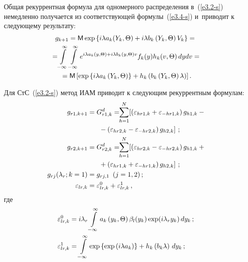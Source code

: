 \begin{multicols}{2}
Общая рекуррентная формула для одномерного распределения в~(\ref{e3.2-s}) 
немедленно получается из соответствующей формулы~(\ref{e3.4-s})
и~приводит к следующему результату:
 \begin{multline}
 g_{k+1} ={\sf M} \exp \left\{ i\lambda a_k (Y_k, \Theta) + i\lambda b_k 
    \left(Y_k,\Theta\right) V_k \right\}={}\\
{}=\! \int\limits_{-\infty}^\infty\int\limits_{-\infty}^\infty e^{i\lambda a_k(y,\Theta) + i\lambda b_k(y,\Theta) v} 
    f_k (y) h_k (v,\Theta)\, dydv={}\\
{}= {\sf M}\left[ \exp \left\{ i \lambda a_k \left(Y_k,\Theta\right) \right\} + 
    h_k \left( b_k \left(Y_k,\Theta\right) \lambda
    \right)\right].\label{e3.5-s}
    \end{multline}

Для СтС~(\ref{e3.2-s}) метод ИАМ приводит к следующим рекуррентным формулам:
 \begin{align}
 g_{r1, k+1} &= G_{r1,k}^d = \!\!\sss_{h=1}^N \!\left[ 
    \left(\varepsilon_{hr1,k}+\varepsilon_{-hr1,k}\right)g_{h1,k}-{}\right.\hspace*{-3.24097pt}\notag\\
&\left.    \hspace*{5mm}{}-
    \left(\varepsilon_{hr2,k}-\varepsilon_{-hr2,k}\right)g_{h2,k}\right]\,;
    \label{e3.6-s}
    \\
g_{r2, k+1} &= G_{r2,k}^d = \!\!\sss_{h=1}^N \!\left[ 
    \left(\varepsilon_{hr2,k}-\varepsilon_{-hr2,k}\right)g_{h1,k}+{}\right.\hspace*{-3.24097pt}\notag\hspace*{-3.24097pt}\\
&\left.    \hspace*{5mm}{}+\left(\varepsilon_{hr1,k}+\varepsilon_{-hr1,k}\right)g_{h2,k}\right]\,;
    \label{e3.7-s}
    \\
    g_{rj} (\lambda_r;k=1) &= g_{rj,1}\enskip (j=1,2)\,;\label{e3.8-s}
    \\
    \varepsilon_{lr,k} &= \varepsilon_{lr,k}^0+\varepsilon_{lr,k}^1\,,\notag
    \end{align}
    где
\begin{align*}
    \varepsilon_{lr,k}^0&=i\lambda_r \int\limits_{-\infty}^\infty a_k 
    \left(y_k,\Theta\right) \beta_l (y_k) \exp (i\lambda_r y_k) \,dy_k\,;
\\
    \varepsilon_{lr,k}^1&=\int\limits_{-\infty}^\infty \exp\left\{ \exp\left(i\lambda a_k\right)\right\}+
    h_k \left(b_k \lambda\right)\, dy_k\,;
    \end{align*}
    

\end{multicols}
